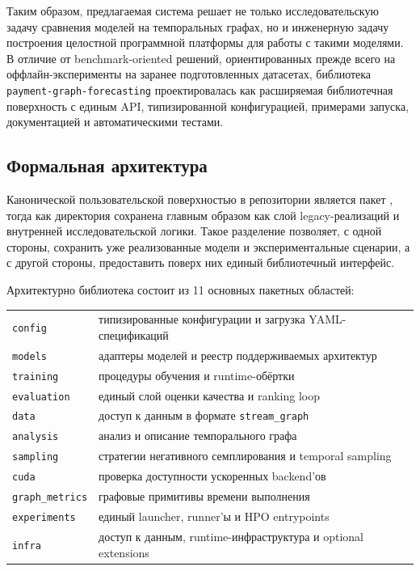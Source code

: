 \documentclass[a4paper,12pt]{extarticle}
\begin{document}
  Таким образом, предлагаемая система решает не только исследовательскую задачу сравнения моделей на темпоральных графах, но и инженерную задачу построения целостной
  программной платформы для работы с такими моделями. В отличие от benchmark-oriented решений, ориентированных прежде всего на оффлайн-эксперименты на заранее
  подготовленных датасетах, библиотека \texttt{payment-graph-forecasting} проектировалась как расширяемая библиотечная поверхность с единым API, типизированной
  конфигурацией, примерами запуска, документацией и автоматическими тестами.

  \subsection{Формальная архитектура}

  Канонической пользовательской поверхностью в репозитории является пакет , тогда как директория  сохранена главным
  образом как слой legacy-реализаций и внутренней исследовательской логики. Такое разделение позволяет, с одной стороны, сохранить уже реализованные модели и
  экспериментальные сценарии, а с другой стороны, предоставить поверх них единый библиотечный интерфейс.

  Архитектурно библиотека состоит из 11 основных пакетных областей:
  \begin{center}
  \begin{tabular}{ll}
  \texttt{config} & типизированные конфигурации и загрузка YAML-спецификаций \\
  \texttt{models} & адаптеры моделей и реестр поддерживаемых архитектур \\
  \texttt{training} & процедуры обучения и runtime-обёртки \\
  \texttt{evaluation} & единый слой оценки качества и ranking loop \\
  \texttt{data} & доступ к данным в формате \texttt{stream\_graph} \\
  \texttt{analysis} & анализ и описание темпорального графа \\
  \texttt{sampling} & стратегии негативного семплирования и temporal sampling \\
  \texttt{cuda} & проверка доступности ускоренных backend'ов \\
  \texttt{graph\_metrics} & графовые примитивы времени выполнения \\
  \texttt{experiments} & единый launcher, runner'ы и HPO entrypoints \\
  \texttt{infra} & доступ к данным, runtime-инфраструктура и optional extensions \\
  \end{tabular}
  \end{center}
\end{document}
